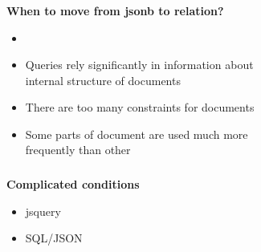 \documentclass[usenames,dvipsnames, 18pt, compress, aspectratio=169]{beamer}
\begin{document}
\begin{frame}
    \frametitle{}
    \begin{center}
    \textbf{When to move from jsonb to relation?}
        \begin{itemize}
            \item <+->
        \end{itemize}

        \begin{itemize}[label={\MVRightarrow}]
            \item <+-> Queries rely significantly in information about\\
                internal structure of documents
            \item <+-> There are too many constraints for documents
            \item <+-> Some parts of document are used much more\\
                frequently than other
        \end{itemize}

    \end{center}
\end{frame}


\begin{frame}
    \frametitle{}
    \begin{center}
    \textbf{Complicated conditions}

        \begin{itemize}[label={\MVRightarrow}]
            \item jsquery
            \item SQL/JSON
        \end{itemize}

    \end{center}
\end{frame}

\end{document}
